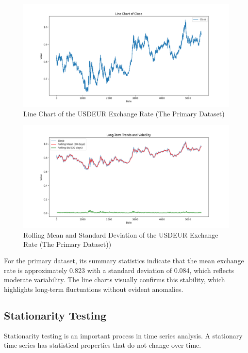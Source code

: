 \begin{figure}[H]
\centering
\includegraphics[width=\textwidth]{figures/line_chart}
\caption{Line Chart of the USDEUR Exchange Rate (The Primary Dataset)}
\label{fig:line_chart}
\end{figure}

\begin{figure}[H]
\centering
\includegraphics[width=\textwidth]{figures/rolling_statistics}
\caption{Rolling Mean and Standard Deviation of the USDEUR Exchange Rate (The Primary Dataset))}
\label{fig:rolling_statistics}
\end{figure}

For the primary dataset, its summary statistics indicate that the mean exchange rate is approximately 0.823 with a standard deviation of 0.084, which reflects moderate variability. The line charts visually confirms this stability, which highlights long-term fluctuations without evident anomalies.

\subsection{Stationarity Testing}
Stationarity testing is an important process in time series analysis. A stationary time series has statistical properties that do not change over time.


